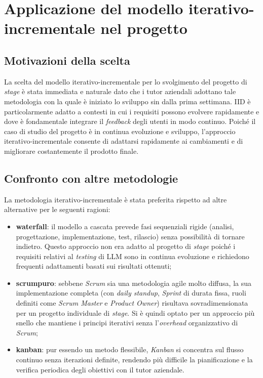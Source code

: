 \section{Applicazione del modello iterativo-incrementale nel progetto}
\subsection{Motivazioni della scelta}
La scelta del modello iterativo-incrementale per lo svolgimento del progetto di \emph{stage} è stata immediata e naturale dato che i tutor aziendali adottano tale metodologia con la quale è iniziato lo sviluppo sin dalla prima settimana. IID è particolarmente adatto a contesti in cui i requisiti possono evolvere rapidamente e dove è fondamentale integrare il \emph{feedback} degli utenti in modo continuo. Poiché il caso di studio del progetto è in continua evoluzione e sviluppo, l'approccio iterativo-incrementale consente di adattarsi rapidamente ai cambiamenti e di migliorare costantemente il prodotto finale.

\subsection{Confronto con altre metodologie}
La metodologia iterativo-incrementale è stata preferita rispetto ad altre alternative per le seguenti ragioni:
\begin{itemize}
    \item \textbf{\gls{waterfall}\glsfirstoccur}: il modello a cascata prevede fasi sequenziali rigide (analisi, progettazione, implementazione, test, rilascio) senza possibilità di tornare indietro. Questo approccio non era adatto al progetto di \emph{stage} poiché i requisiti relativi al \emph{testing} di LLM sono in continua evoluzione e richiedono frequenti adattamenti basati sui risultati ottenuti;
    \item \textbf{\gls{scrum}\glsfirstoccur puro}: sebbene \emph{Scrum} sia una metodologia agile molto diffusa, la sua implementazione completa (con \emph{daily standup}, \emph{Sprint} di durata fissa, ruoli definiti come \emph{Scrum Master} e \emph{Product Owner}) risultava sovradimensionata per un progetto individuale di \emph{stage}. Si è quindi optato per un approccio più snello che mantiene i principi iterativi senza l'\emph{overhead} organizzativo di \emph{Scrum};
    \item \textbf{\gls{kanban}\glsfirstoccur}: pur essendo un metodo flessibile, \emph{Kanban} si concentra sul flusso continuo senza iterazioni definite, rendendo più difficile la pianificazione e la verifica periodica degli obiettivi con il tutor aziendale.
\end{itemize}


